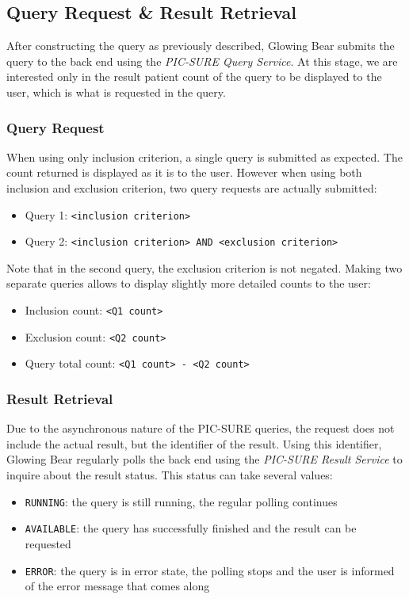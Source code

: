 \subsection{Query Request \& Result Retrieval}
\label{sec:interoplayer-gb-results}

After constructing the query as previously described, Glowing Bear submits the query to the back end using the \emph{PIC-SURE Query Service}.
At this stage, we are interested only in the result patient count of the query to be displayed to the user, which is what is requested in the query.

\subsubsection{Query Request}
When using only inclusion criterion, a single query is submitted as expected. 
The count returned is displayed as it is to the user.
However when using both inclusion and exclusion criterion, two query requests are actually submitted:
\begin{itemize}
    \setlength\itemsep{0em}

    \item Query 1: \verb|<inclusion criterion>|
    \item Query 2: \verb|<inclusion criterion> AND <exclusion criterion>|
\end{itemize}

Note that in the second query, the exclusion criterion is not negated.
Making two separate queries allows to display slightly more detailed counts to the user:
\begin{itemize}
    \setlength\itemsep{0em}

    \item Inclusion count: \verb|<Q1 count>|
    \item Exclusion count: \verb|<Q2 count>|
    \item Query total count: \verb|<Q1 count> - <Q2 count>|
\end{itemize}


\subsubsection{Result Retrieval}
Due to the asynchronous nature of the PIC-SURE queries, the request does not include the actual result, but the identifier of the result.
Using this identifier, Glowing Bear regularly polls the back end using the \emph{PIC-SURE Result Service} to inquire about the result status.
This status can take several values:
\begin{itemize}
    \setlength\itemsep{0em}

    \item \verb|RUNNING|: the query is still running, the regular polling continues
    \item \verb|AVAILABLE|: the query has successfully finished and the result can be requested
    \item \verb|ERROR|: the query is in error state, the polling stops and the user is informed of the error message that comes along
\end{itemize}

